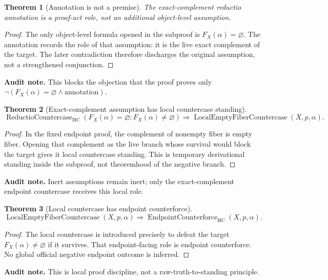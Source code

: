\documentclass[11pt]{article}
\newtheorem{theorem}{Theorem}[section]
\newcommand{\HC}{\operatorname{HC}}
\begin{document}
\begin{theorem}[Annotation is not a premise]\label{thm:annotation-not-premise}
The exact-complement reductio annotation is a proof-act role, not an additional object-level assumption.
\end{theorem}
\begin{proof}
The only object-level formula opened in the subproof is $F_X(\alpha)=\varnothing$.  The annotation records the role of that assumption: it is the live exact complement of the target.  The later contradiction therefore discharges the original assumption, not a strengthened conjunction.
\end{proof}
\par\noindent\textbf{Audit note.} This blocks the objection that the proof proves only $\neg(F_X(\alpha)=\varnothing\wedge\mathrm{annotation})$.

\begin{theorem}[Exact-complement assumption has local countercase standing]\label{thm:exact-complement-local-countercase}
\[
\operatorname{ReductioCountercase}_{\HC}(F_X(\alpha)=\varnothing;F_X(\alpha)\neq\varnothing)
\Rightarrow \operatorname{LocalEmptyFiberCountercase}(X,p,\alpha).
\]
\end{theorem}
\begin{proof}
In the fixed endpoint proof, the complement of nonempty fiber is empty fiber.  Opening that complement as the live branch whose survival would block the target gives it local countercase standing.  This is temporary derivational standing inside the subproof, not theoremhood of the negative branch.
\end{proof}
\par\noindent\textbf{Audit note.} Inert assumptions remain inert; only the exact-complement endpoint countercase receives this local role.

\begin{theorem}[Local countercase has endpoint counterforce]\label{thm:local-countercase-endpoint-counterforce}
\[
\operatorname{LocalEmptyFiberCountercase}(X,p,\alpha)
\Rightarrow \operatorname{EndpointCounterforce}_{\HC}(X,p,\alpha).
\]
\end{theorem}
\begin{proof}
The local countercase is introduced precisely to defeat the target $F_X(\alpha)\neq\varnothing$ if it survives.  That endpoint-facing role is endpoint counterforce.  No global official negative endpoint outcome is inferred.
\end{proof}
\par\noindent\textbf{Audit note.} This is local proof discipline, not a raw-truth-to-standing principle.
\end{document}
